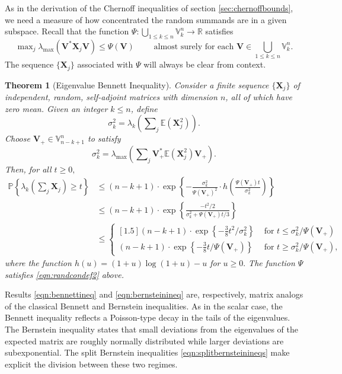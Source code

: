 \documentclass[11pt,letterpaper,twoside,reqno,nosumlimits]{amsart}
\renewcommand{\star}{*}
\newcommand{\mat}[1]{\ensuremath{\bm{#1}}} %
\newcommand{\E}{\ensuremath{\mathbb{E}}}
\newcommand{\Prob}[1]{\ensuremath{\mathbb{P}\left\{#1\right\}}}
\newcommand{\R}{\ensuremath{\mathbb{R}}}
\newcommand{\randcon}{\ensuremath{\Psi}}
\newcommand{\lambdamax}[1]{\ensuremath{\lambda_{\mathrm{max}}\left(#1\right)}}
\newcommand{\Isom}[2]{\ensuremath{\mathbb{V}_{#1}^{#2}}}
\newtheorem{thm}{Theorem}
\theoremstyle{remark}
\numberwithin{equation}{section}
\numberwithin{thm}{section}
\numberwithin{prop}{section}
\numberwithin{defn}{section}
\numberwithin{remark}{section}
\begin{document}
As in the derivation of the Chernoff inequalities of section \ref{sec:chernoffbounds}, we need a measure of how concentrated the random summands are in a given subspace. Recall that the function $\randcon : \bigcup_{1 \leq k \leq n} \Isom{k}{n} \rightarrow \R$ satisfies
\begin{equation}
	\max\nolimits_j \lambdamax{\mat{V}^\star \mat{X}_j \mat{V}} \leq \randcon(\mat{V}) \qquad \text{ almost surely for each } \mat{V} \in \bigcup_{1 \leq k \leq n} \Isom{k}{n}. 
\label{eqn:randcondef2}
\end{equation}
The sequence $\{\mat{X}_j\}$ associated with $\randcon$ will always be clear from context.

\begin{thm}[Eigenvalue Bennett Inequality]
\label{thm:bennett}
Consider a finite sequence $\{\mat{X}_j\}$ of independent, random, self-adjoint matrices with dimension $n$, all of which have zero mean. Given an integer $k \leq n$, define
\[
 \sigma_k^2 = \lambda_k\left(\sum\nolimits_j \E(\mat{X}_j^2) \right). 
\]
Choose $\mat{V}_{+}\in \Isom{n-k+1}{n}$ to satisfy
\[
 \sigma_k^2 = \lambdamax{\sum\nolimits_j \mat{V}_{+}^\star\E(\mat{X}_j^2)\mat{V}_{+}}.
\]
Then, for all $t \geq 0,$
\begin{align}
\Prob{\lambda_k\left( \sum\nolimits_j \mat{X}_j \right) \geq t } & \leq (n-k+1) \cdot \exp\left\{-\frac{\sigma_k^2}{\randcon(\mat{V}_{+})^2} \cdot h\left(\frac{\randcon(\mat{V}_{+})t}{\sigma_k^2}\right) \right\} \tag{i} \label{eqn:bennettineq} \\
 & \leq (n-k+1) \cdot \exp\left\{ \frac{-t^2/2}{\sigma_k^2 + \randcon(\mat{V}_+)t/3} \right\} \tag{ii} \label{eqn:bernsteinineq} \\
 & \leq \begin{cases}[1.5]
        (n-k+1) \cdot \exp\left\{-\tfrac{3}{8}t^2/\sigma_k^2\right\}  & \text{ for } t \leq \sigma_k^2/\randcon(\mat{V}_+) \\
        (n-k+1) \cdot \exp\left\{-\tfrac{3}{8} t/\randcon(\mat{V}_+)\right\} & \text{ for } t \geq \sigma_k^2/\randcon(\mat{V}_+),  
        \end{cases} \tag{iii}  \label{eqn:splitbernsteinineqs} 
\end{align}
where the function $h(u) = (1+u)\log(1+u) - u$ for $u \geq 0.$ The function $\randcon$ satisfies \eqref{eqn:randcondef2} above.
\end{thm}

Results \eqref{eqn:bennettineq} and \eqref{eqn:bernsteinineq} are, respectively, matrix analogs of the classical Bennett and Bernstein inequalities. As in the scalar case, the Bennett inequality reflects a Poisson-type decay in the tails of the eigenvalues. The Bernstein inequality states that small deviations from the eigenvalues of the expected matrix are roughly normally distributed while larger deviations are subexponential. The split Bernstein inequalities \eqref{eqn:splitbernsteinineqs} make explicit the division between these two regimes.
\end{document}

